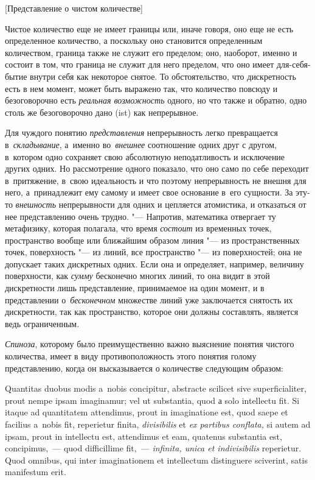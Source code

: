 %
{[Представление о чистом количестве]}

Чистое количество еще не имеет границы или, иначе говоря, оно еще не есть
определенное количество, а поскольку оно становится определенным
количеством, граница также не служит его пределом; оно, наоборот, именно и
состоит в том, что граница не служит для него пределом, что оно имеет
для-себя-бытие внутри себя как некоторое снятое. То обстоятельство, что
дискретность есть в нем момент, может быть выражено так, что количество
повсюду и безоговорочно есть {\em реальная возможность} одного, но
что также и обратно, одно столь же безоговорочно дано (ist) как непрерывное.

Для чуждого понятию {\em представления} непрерывность легко превращается
в~{\em складывание}, а~именно во~{\em внешнее} соотношение одних друг с другом,
в~котором одно сохраняет свою абсолютную неподатливость и исключение других
одних. Но рассмотрение одного показало, что оно само по себе переходит
в~притяжение, в~свою идеальность и что поэтому непрерывность не внешня для
него, а~принадлежит ему самому и имеет свое основание в~его сущности. За эту-то
{\em внешность} непрерывности для одних и цепляется атомистика, и отказаться от
нее представлению очень трудно. "--- Напротив, математика отвергает ту
метафизику, которая полагала, что время {\em состоит} из временных точек,
пространство вообще или ближайшим образом линия "--- из пространственных точек,
поверхность "--- из линий, все пространство "--- из поверхностей; она не
допускает таких дискретных одних. Если она и определяет, например, величину
поверхности, как {\em сумму} бесконечно многих линий, то она видит в этой
дискретности лишь представление, принимаемое на один момент, и в представлении
о~{\em бесконечном} множестве линий уже заключается снятость их дискретности,
так как пространство, которое они должны составлять, является ведь
ограниченным.

{\em Спиноза}, которому было преимущественно важно выяснение понятия чистого
количества, имеет в виду противоположность этого понятия голому представлению,
когда он высказывается о количестве следующим образом:

\vspace{3mm}

\begin{footnotesize}\fontsize{10}{13}\selectfont
Quantitas duobus modis a~nobis conci\-pitur, abs\-trac\-te scili\-cet
sive super\-fi\-ci\-ali\-ter, prout nempe ipsam ima\-gina\-mur; vel ut
sub\-stan\-tia, quod а solo intel\-lectu fit. Si itaque ad quanti\-tatem
atten\-di\-mus, prout in imagin\-ati\-one est, quod saepe et faci\-lius
a~nobis fit, repe\-rietur finita, {\em divi\-sibi\-lis} et
{\em ex parti\-bus con\-flata,} si autem ad ipsam, prout in intel\-lectu est,
atten\-di\-mus et eam, quate\-nus sub\-stan\-tia est, con\-cipi\-mus,~--- quod
dif\-ficil\-lime fit,~--- {\em infi\-nita, unica et indi\-vi\-si\-bi\-lis}
re\-pe\-rietur. Quod omni\-bus, qui inter ima\-gi\-na\-tio\-nem et
intel\-lectum dis\-tin\-guere scive\-rint, satis mani\-fes\-tum erit.\par
\end{footnotesize}

